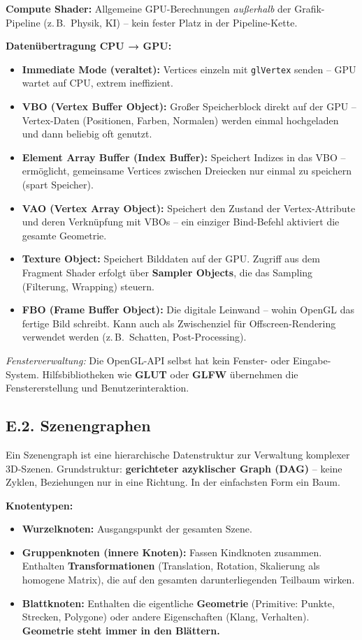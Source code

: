 \documentclass[12pt, a4paper]{article}
\begin{document}
\textbf{Compute Shader:} Allgemeine GPU-Berechnungen \textit{außerhalb} der Grafik-Pipeline (z.\,B.\ Physik, KI) -- kein fester Platz in der Pipeline-Kette.

\medskip
\textbf{Datenübertragung CPU → GPU:}

\begin{itemize}
  \item \textbf{Immediate Mode (veraltet):} Vertices einzeln mit \texttt{glVertex} senden -- GPU wartet auf CPU, extrem ineffizient.
  \item \textbf{VBO (Vertex Buffer Object):} Großer Speicherblock direkt auf der GPU -- Vertex-Daten (Positionen, Farben, Normalen) werden einmal hochgeladen und dann beliebig oft genutzt.
  \item \textbf{Element Array Buffer (Index Buffer):} Speichert Indizes in das VBO -- ermöglicht, gemeinsame Vertices zwischen Dreiecken nur einmal zu speichern (spart Speicher).
  \item \textbf{VAO (Vertex Array Object):} Speichert den Zustand der Vertex-Attribute und deren Verknüpfung mit VBOs -- ein einziger Bind-Befehl aktiviert die gesamte Geometrie.
  \item \textbf{Texture Object:} Speichert Bilddaten auf der GPU. Zugriff aus dem Fragment Shader erfolgt über \textbf{Sampler Objects}, die das Sampling (Filterung, Wrapping) steuern.
  \item \textbf{FBO (Frame Buffer Object):} Die digitale Leinwand -- wohin OpenGL das fertige Bild schreibt. Kann auch als Zwischenziel für Offscreen-Rendering verwendet werden (z.\,B.\ Schatten, Post-Processing).
\end{itemize}

\textit{Fensterverwaltung:} Die OpenGL-API selbst hat kein Fenster- oder Eingabe-System. Hilfsbibliotheken wie \textbf{GLUT} oder \textbf{GLFW} übernehmen die Fenstererstellung und Benutzerinteraktion.

\subsection*{E.2. Szenengraphen}

Ein Szenengraph ist eine hierarchische Datenstruktur zur Verwaltung komplexer 3D-Szenen. Grundstruktur: \textbf{gerichteter azyklischer Graph (DAG)} -- keine Zyklen, Beziehungen nur in eine Richtung. In der einfachsten Form ein Baum.

\textbf{Knotentypen:}
\begin{itemize}
  \item \textbf{Wurzelknoten:} Ausgangspunkt der gesamten Szene.
  \item \textbf{Gruppenknoten (innere Knoten):} Fassen Kindknoten zusammen. Enthalten \textbf{Transformationen} (Translation, Rotation, Skalierung als homogene Matrix), die auf den gesamten darunterliegenden Teilbaum wirken.
  \item \textbf{Blattknoten:} Enthalten die eigentliche \textbf{Geometrie} (Primitive: Punkte, Strecken, Polygone) oder andere Eigenschaften (Klang, Verhalten). \textbf{Geometrie steht immer in den Blättern.}
\end{itemize}
\end{document}
